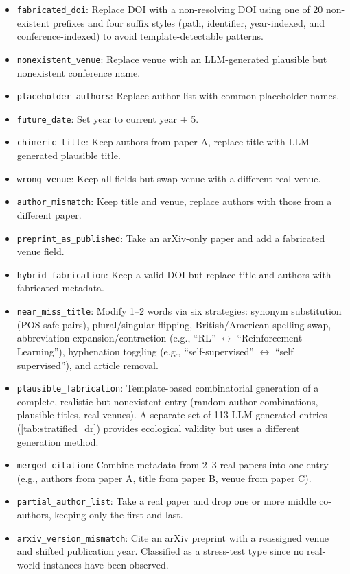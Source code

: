 \begin{itemize}
    \item \texttt{fabricated\_doi}: Replace DOI with a non-resolving DOI using one of 20 non-existent prefixes and four suffix styles (path, identifier, year-indexed, and conference-indexed) to avoid template-detectable patterns.
    \item \texttt{nonexistent\_venue}: Replace venue with an LLM-generated plausible but nonexistent conference name.
    \item \texttt{placeholder\_authors}: Replace author list with common placeholder names.
    \item \texttt{future\_date}: Set year to current year + 5.
    \item \texttt{chimeric\_title}: Keep authors from paper A, replace title with LLM-generated plausible title.
    \item \texttt{wrong\_venue}: Keep all fields but swap venue with a different real venue.
    \item \texttt{author\_mismatch}: Keep title and venue, replace authors with those from a different paper.
    \item \texttt{preprint\_as\_published}: Take an arXiv-only paper and add a fabricated venue field.
    \item \texttt{hybrid\_fabrication}: Keep a valid DOI but replace title and authors with fabricated metadata.
    \item \texttt{near\_miss\_title}: Modify 1--2 words via six strategies: synonym substitution (POS-safe pairs), plural/singular flipping, British/American spelling swap, abbreviation expansion/contraction (e.g., ``RL'' $\leftrightarrow$ ``Reinforcement Learning''), hyphenation toggling (e.g., ``self-supervised'' $\leftrightarrow$ ``self supervised''), and article removal.
    \item \texttt{plausible\_fabrication}: Template-based combinatorial generation of a complete, realistic but nonexistent entry (random author combinations, plausible titles, real venues). A separate set of 113 LLM-generated entries (\cref{tab:stratified_dr}) provides ecological validity but uses a different generation method.
    \item \texttt{merged\_citation}: Combine metadata from 2--3 real papers into one entry (e.g., authors from paper A, title from paper B, venue from paper C).
    \item \texttt{partial\_author\_list}: Take a real paper and drop one or more middle co-authors, keeping only the first and last.
    \item \texttt{arxiv\_version\_mismatch}: Cite an arXiv preprint with a reassigned venue and shifted publication year. Classified as a stress-test type since no real-world instances have been observed.
\end{itemize}

